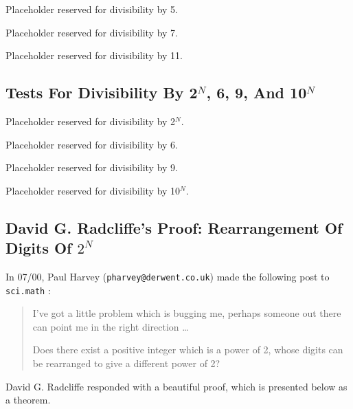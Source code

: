 Placeholder
reserved for divisibility by 5.

Placeholder
reserved for divisibility by 7.

Placeholder
reserved for divisibility by 11.


\subsection{Tests For Divisibility By  2$^N$, 6, 9, And 10$^N$}

Placeholder
reserved for divisibility by 2$^N$.

Placeholder
reserved for divisibility by 6.

Placeholder
reserved for divisibility by 9.

Placeholder
reserved for divisibility by 10$^N$.


\subsection{David G. Radcliffe's Proof:  Rearrangement Of Digits Of $2^N$}

In 07/00, Paul Harvey (\texttt{pharvey@derwent.co.uk}) made the following
post to \texttt{sci.math} \cite{bibref:n:scimathnewsgroup}:

\begin{quote}
{I've got a little problem which is bugging me, perhaps someone out there
can point me in the right direction \ldots{}}

{Does there exist a positive integer which is a power of 2, whose digits can
be rearranged to give a different power of 2?}
\end{quote}

David G. Radcliffe \cite{bibref:i:davidgradcliffe}
responded with a beautiful proof, which is presented below
as a theorem.

